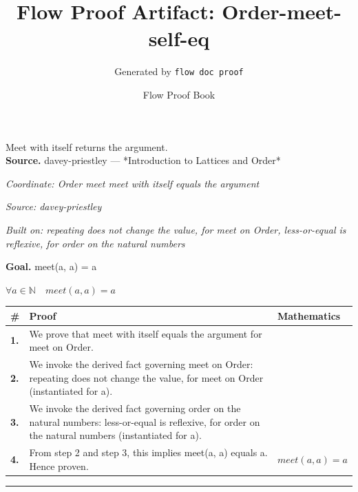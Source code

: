 \documentclass[11pt]{article}
\title{Flow Proof Artifact: Order-meet-self-eq}
\author{Generated by \texttt{flow doc proof}}
\date{Flow Proof Book}
\theoremstyle{definition}
\begin{document}
\maketitle
Meet with itself returns the argument.\\[0.5em]
\textbf{Source.} davey-priestley — *Introduction to Lattices and Order*\\[0.5em]
\bigskip
{}\par
\smallskip\noindent\textit{Coordinate: Order \cdot meet \cdot meet with itself equals the argument}\par
\smallskip\noindent\textit{Source: davey-priestley}\par
\smallskip\noindent\textit{Built on: repeating does not change the value, for meet on Order, less-or-equal is reflexive, for order on the natural numbers}\par
\medskip
\noindent\textbf{Goal.} meet(a, a) = a\par
\noindent$\displaystyle \forall a \in \mathbb{N}\quad meet(a, a) = a$\par
\medskip
\noindent
\begin{tabular}{@{} >{\raggedright\arraybackslash}p{} >{\raggedright\arraybackslash}p{} >{\raggedleft\arraybackslash}p{} @{}}
\textbf{\#} & \textbf{Proof} & \textbf{Mathematics} \\
\midrule
\textbf{1.} & We prove that meet with itself equals the argument for meet on Order. & \\[0.45em]
\textbf{2.} & We invoke the derived fact governing meet on Order: repeating does not change the value, for meet on Order (instantiated for a). & \\[0.45em]
\textbf{3.} & We invoke the derived fact governing order on the natural numbers: less-or-equal is reflexive, for order on the natural numbers (instantiated for a). & \\[0.45em]
\textbf{4.} & From step 2 and step 3, this implies meet(a, a) equals a. Hence proven. & $\displaystyle meet(a, a) = a$ \\[0.45em]
\bottomrule
\end{tabular}
\label{thm:Order-meet-meet_with_itself_equals_the_argument}
\par\medskip\hrule
\end{document}
